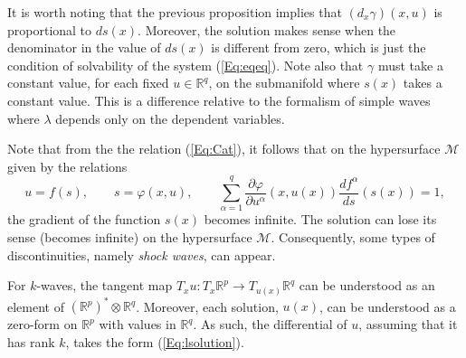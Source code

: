 \documentclass{birkjour}
\theoremstyle{definition}
\theoremstyle{remark}
\numberwithin{equation}{section}
\numberwithin{equation}{section}
\numberwithin{thm}{section}
\numberwithin{equation}{section}
\numberwithin{thm}{section}
\begin{document}
It is worth noting that the previous proposition implies that $(d_x\gamma)(x,u)$ is proportional to $ds(x)$. Moreover, the solution makes sense when the denominator in the value of $ds(x)$ is different from zero, which is just the condition of solvability of the system (\ref{Eq:eqeq}). Note also that $\gamma$ must take a constant value, for each fixed $u\in \mathbb{R}^q$, on the submanifold where $s(x)$ takes a constant value. This is a difference relative to the formalism of simple waves where $\lambda$ depends only on the dependent variables.


Note that from the the relation (\ref{Eq:Cat}), it follows that on the hypersurface $\mathcal{M}$ given by the   relations 
$$
u=f(s),\qquad s=\varphi(x,u),\qquad \sum_{\alpha=1}^q\frac{\partial \varphi}{\partial u^\alpha}(x,u(x))\frac{df^\alpha}{ds}(s(x))=1,
$$
the gradient of the function $s(x)$ becomes infinite. The solution can lose its sense (becomes infinite) on the hypersurface $\mathcal{M}$. Consequently, some types of discontinuities, namely {\it shock waves}, can appear.

For $k$-waves, the tangent  map $T_xu:T_x\mathbb{R}^p\rightarrow T_{u(x)}\mathbb{R}^q$ can be understood as an element of $(\mathbb{R}^{p})^*\otimes \mathbb{R}^q$. Moreover, each solution, $u(x)$, can be understood as a zero-form on $\mathbb{R}^p$ with values in $\mathbb{R}^q$. As such, the differential of $u$, assuming that it has rank $k$, takes the form  (\ref{Eq:lsolution}). 
\end{document}
